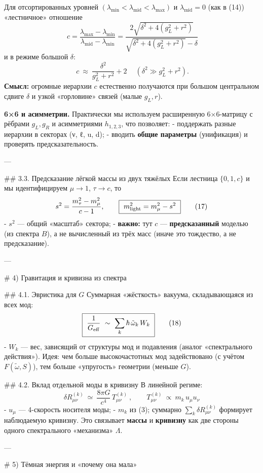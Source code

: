 \documentclass[12pt,a4paper]{article}
\begin{document}
Для отсортированных уровней \((\lambda_{\min}<\lambda_{\mathrm{mid}}<\lambda_{\max})\) и \(\lambda_{\mathrm{mid}}=0\) (как в (14)) «лестничное» отношение
\[
\boxed{\
c=\frac{\lambda_{\max}-\lambda_{\min}}{\lambda_{\mathrm{mid}}-\lambda_{\min}}
=\frac{2\sqrt{\delta^2+4(g_L^2+r^2)}}{\sqrt{\delta^2+4(g_L^2+r^2)}-\delta} }\tag{15}
\]
и в режиме большой \(\delta\):
\[
\boxed{\ c\ \approx\ \frac{\delta^2}{g_L^2+r^2}+2\ } \quad (\delta^2\gg g_L^2+r^2). \tag{16}
\]
\textbf{Смысл:} огромные иерархии \(c\) естественно получаются при большом центральном сдвиге \(\delta\) и узкой «горловине» связей (малые \(g_L,r\)).

\textbf{6×6 и асимметрии.} Практически мы используем расширенную 6×6-матрицу с рёбрами \(g_L,g_R\) и асимметриями \(h_{1,2,3}\), что позволяет:
- поддержать разные иерархии в секторах (ν, ℓ, u, d);
- вводить \textbf{общие параметры} (унификация) и проверять предсказательность.

---

## 3.3. Предсказание лёгкой массы из двух тяжёлых
Если лестница \(\{0,1,c\}\) и мы идентифицируем \(\mu\to 1\), \(\tau\to c\), то
\[
s^2=\frac{m_\tau^2-m_\mu^2}{c-1},\qquad
\boxed{\ m_{\rm light}^2=m_\mu^2-s^2\ } \tag{17}
\]
- \(s^2\) — общий «масштаб» сектора;  
- \textbf{важно:} тут \(c\) — \textbf{предсказанный} моделью (из спектра \(B\)), а не вычисленный из трёх масс (иначе это тождество, а не предсказание).

---

\# 4) Гравитация и кривизна из спектра

## 4.1. Эвристика для \(G\)
Суммарная «жёсткость» вакуума, складывающаяся из всех мод:
\[
\boxed{\ \frac{1}{G_{\rm eff}}\ \sim\ \sum_k \hbar\,\tilde\omega_k \,W_k \ } \tag{18}
\]
- \(W_k\) — вес, зависящий от структуры мод и подавления (аналог «спектрального действия»).
Идея: чем больше высокочастотных мод задействовано (с учётом \(F(\tilde\omega,S)\)), тем больше «упругость» геометрии (меньше \(G\)).

## 4.2. Вклад отдельной моды в кривизну
В линейной региме:
\[
\boxed{\
\delta R_{\mu\nu}^{(k)}\ \simeq\ \frac{8\pi G}{c^4}\,T_{\mu\nu}^{(k)}\ ,\qquad
T_{\mu\nu}^{(k)} \ \propto\ m_k\,u_\mu u_\nu\ } \tag{19}
\]
- \(u_\mu\) — 4-скорость носителя моды;  
- \(m_k\) из (3); суммарно \(\sum_k \delta R_{\mu\nu}^{(k)}\) формирует наблюдаемую кривизну.  
Это связывает \textbf{массы} и \textbf{кривизну} как две стороны одного спектрального «механизма» \(\Lambda\).

---

\# 5) Тёмная энергия и «почему она мала»
\end{document}
